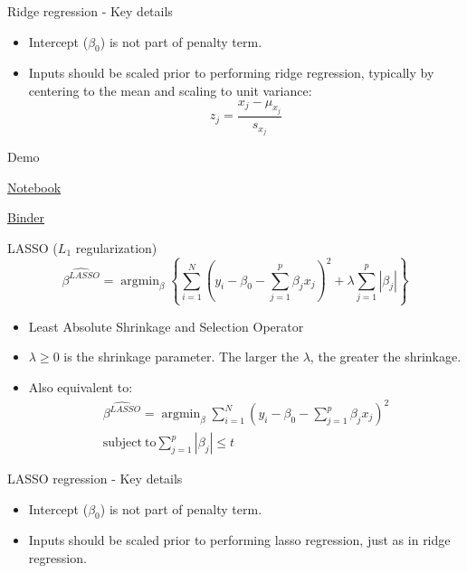 \documentclass{beamer}
\DeclareMathOperator*{\argmin}{argmin}
\begin{document}
\begin{frame}{Ridge regression - Key details}
    \begin{itemize}
        \item Intercept ($\beta_0$) is not part of penalty term.
        \item Inputs should be scaled prior to performing ridge regression, typically by centering to the mean and scaling to unit variance:
        \begin{equation*}
            z_j = \frac{x_j - \mu_{x_j}}{s_{x_j}}
        \end{equation*}
    \end{itemize}
\end{frame} 


\begin{frame}{Demo}
    \centerline{\href{https://github.com/materialsvirtuallab/nano281/tree/master/lectures}{Notebook}}
    \centerline{\href{https://mybinder.org/v2/gh/materialsvirtuallab/nano281/master?filepath=lectures}{Binder}}
\end{frame} 



\begin{frame}{LASSO ($L_1$ regularization)}
    \begin{equation*}
        \hat{\beta^{LASSO}} = \argmin_\beta \left \{ \sum_{i=1}^N (y_i - \beta_0 - \sum_{j=1}^p \beta_j x_j)^2 + \lambda \sum_{j=1}^p |\beta_j| \right \}
    \end{equation*}
    \begin{itemize}
        \item Least Absolute Shrinkage and Selection Operator
        \item $\lambda \geq 0$ is the shrinkage parameter. The larger the $\lambda$, the greater the shrinkage.
        \item Also equivalent to:
        \begin{eqnarray*}
        \hat{\beta^{LASSO}} = \argmin_\beta \sum_{i=1}^N (y_i - \beta_0 - \sum_{j=1}^p \beta_j x_j)^2\\
        \mathrm{subject~to} \sum_{j=1}^p |\beta_j| \leq t
        \end{eqnarray*}
    \end{itemize}
\end{frame}


\begin{frame}{LASSO regression - Key details}
    \begin{itemize}
        \item Intercept ($\beta_0$) is not part of penalty term.
        \item Inputs should be scaled prior to performing lasso regression, just as in ridge regression.
    \end{itemize}
\end{frame} 
\end{document}
